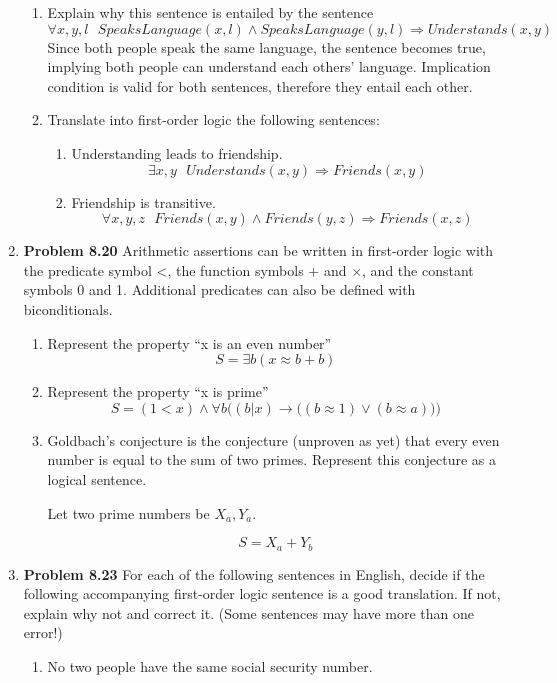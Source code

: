 \documentclass[10pt]{article}
\begin{document}
\begin{enumerate}
\begin{enumerate}
  \item Explain why this sentence is entailed by the sentence
    \[ \forall x,y,l \textrm{ } SpeaksLanguage(x,l) \wedge SpeaksLanguage(y,l) \Rightarrow Understands(x,y) \]
    Since both people speak the same language, the sentence becomes true, implying both people can understand each others' language. Implication condition is valid for both sentences, therefore they entail each other.
  \item Translate into first-order logic the following sentences:
    \begin{enumerate}
    \item Understanding leads to friendship.
      \[ \exists x,y \textrm{ } Understands(x,y) \Rightarrow Friends(x,y) \]
    \item Friendship is transitive.
      \[ \forall x,y,z \textrm{ }Friends(x,y) \wedge Friends(y,z) \Rightarrow Friends(x,z) \]
    \end{enumerate}
  \end{enumerate}
\item \textbf{Problem 8.20} Arithmetic assertions can be written in first-order logic with the predicate symbol <, the function symbols + and $\times$, and the constant symbols 0 and 1. Additional predicates can also be defined with biconditionals.
  \begin{enumerate}
  \item Represent the property ``x is an even number''
    \[ S = \exists b(x \approx b + b) \]
  \item Represent the property ``x is prime''
    \[ S = (1 < x) \wedge \forall b\bigg((b | x) \rightarrow \big((b\approx 1) \lor (b \approx a)\big)\bigg) \]
  \item Goldbach's conjecture is the conjecture (unproven as yet) that every even number is equal to the sum of two primes. Represent this conjecture as a logical sentence. 
    \begin{center}
      Let two prime numbers be $X_a,Y_a$.
    \end{center}
    \[ S = X_a + Y_b \]
  \end{enumerate}
\item \textbf{Problem 8.23} For each of the following sentences in English, decide if the following accompanying first-order logic sentence is a good translation. If not, explain why not and correct it. (Some sentences may have more than one error!)
  \begin{enumerate}
  \item No two people have the same social security number.

\end{enumerate}
\end{enumerate}
\end{document}
